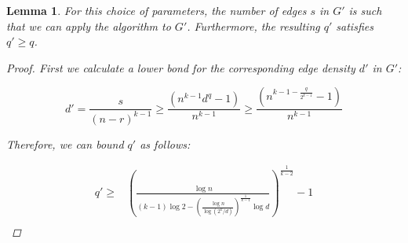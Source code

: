 \documentclass[12pt]{article}
\newtheorem{lemma}[thm]{Lemma}
\begin{document}
    \begin{lemma} \label{lemma:q_prime}
        For this choice of parameters, the number of edges $s$ in $G'$
        is such that we can apply the algorithm to $G'$.
        Furthermore, the resulting $q'$ satisfies $q' \geq q$.

        \begin{proof}
            First we calculate a lower bond for the corresponding edge density $d'$ in $G'$:

            \begin{equation*}
                d' = \frac{s}{(n-r)^{k-1}} \geq \frac{\left(n^{k-1} d^{q} - 1\right)}{n^{k-1}}
                \geq \frac{\left(n^{k - 1 - \frac{q}{2^{k-1}}} - 1\right)}{n^{k-1}}
            \end{equation*}

            Therefore, we can bound $q'$ as follows:

            \begin{align*} %
                q' \geq &
                \left(
                \frac{\log n}{(k-1) \log 2 - \left(\frac{\log n}{\log (2^k/d)} \right)^{\frac{1}{k-1}} \log d}
                \right)^{\frac{1}{k-2}} - 1 \\
            \end{align*}


        \end{proof}

    \end{lemma}








    
    
\end{document}
